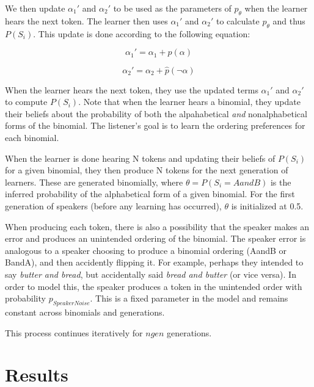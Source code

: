 \documentclass[10pt, letterpaper]{article}
\begin{document}
We then update \(\alpha_1'\) and \(\alpha_2'\) to be used as the
parameters of \(p_\theta\) when the learner hears the next token. The
learner then uses \(\alpha_1'\) and \(\alpha_2'\) to calculate
\(p_\theta\) and thus \(P(S_i)\). This update is done according to the
following equation:

\begin{equation}
\label{eq:alpha1}
\alpha_1' = \alpha_1 + \hat{p}(\alpha)
\end{equation}

\begin{equation}
\label{eq:alpha2}
\alpha_2' = \alpha_2 + \hat{p}(\neg\alpha)
\end{equation}

When the learner hears the next token, they use the updated terms
\(\alpha_1'\) and \(\alpha_2'\) to compute \(P(S_i)\). Note that when
the learner hears a binomial, they update their beliefs about the
probability of both the alpahabetical \emph{and} nonalphabetical forms
of the binomial. The listener's goal is to learn the ordering
preferences for each binomial.

When the learner is done hearing N tokens and updating their beliefs of
\(P(S_i)\) for a given binomial, they then produce N tokens for the next
generation of learners. These are generated binomially, where
\(\theta = P(S_i=AandB)\) is the inferred probability of the
alphabetical form of a given binomial. For the first generation of
speakers (before any learning has occurred), \(\theta\) is initialized
at 0.5.

When producing each token, there is also a possibility that the speaker
makes an error and produces an unintended ordering of the binomial. The
speaker error is analogous to a speaker choosing to produce a binomial
ordering (AandB or BandA), and then accidently flipping it. For example,
perhaps they intended to say \emph{butter and bread}, but accidentally
said \emph{bread and butter} (or vice versa). In order to model this,
the speaker produces a token in the unintended order with probability
\(p_{SpeakerNoise}\). This is a fixed parameter in the model and remains
constant across binomials and generations.

This process continues iteratively for \(ngen\) generations.

\hypertarget{results}{%
\section{Results}\label{results}}
\end{document}
